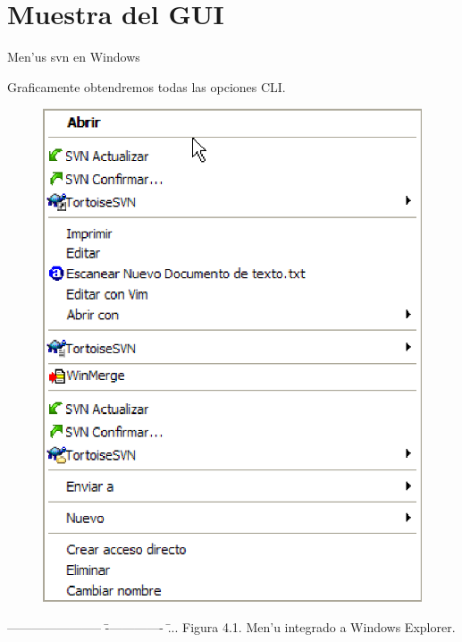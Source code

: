 \documentclass[xcolor=dvipsnames]{beamer}
\begin{document}
\section{Muestra del GUI}
	\begin{frame}{Men'us svn en Windows}
	\scriptsize
	{
	\begin{tabbing}
		Graficamente obtendremos todas las opciones CLI.
	\end{tabbing}
	\begin{figure}
	\centering 
		\includegraphics[scale=0.49]{svn_menu.eps} 
	\end{figure}

	\begin{tabbing}
		----------------------- \= -------------- \= ... \kill
		\> Figura 4.1. Men'u integrado a Windows Explorer.
	\end{tabbing}
	}
	\end{frame}
	
\end{document}
